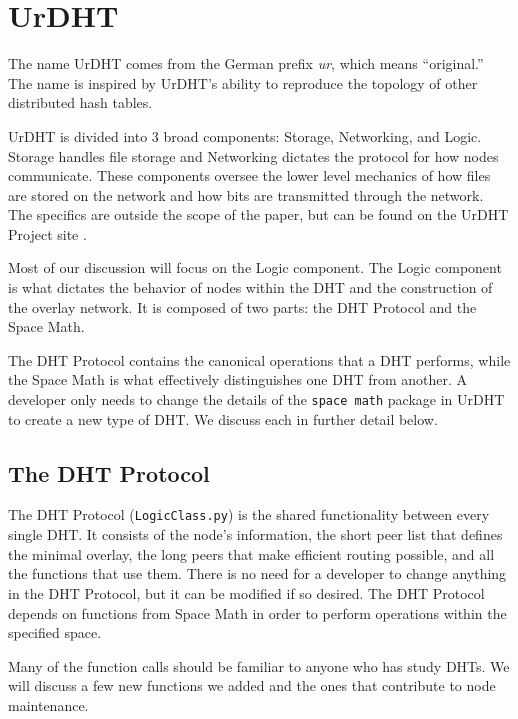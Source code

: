 \section{UrDHT}
\label{sec:urdht}


The name UrDHT comes from the German prefix \textit{ur}, which means ``original.'' 
The name is inspired by UrDHT's ability to reproduce the topology of other distributed hash tables.

UrDHT is divided into 3 broad components: Storage, Networking, and Logic.
Storage handles file storage and Networking dictates the protocol for how nodes communicate.
These components oversee the lower level mechanics of how files are stored on the network and how bits are transmitted through the network.
The specifics are outside the scope of the paper, but can be found on the UrDHT Project site \cite{urdht}.

Most of our discussion will focus on the Logic component.
The Logic component is what dictates the behavior of nodes within the DHT and the construction of the overlay network.
It is composed of two parts: the DHT Protocol and the Space Math.

The DHT Protocol contains the canonical operations that a DHT performs, while the Space Math is what effectively distinguishes one DHT from another.
A developer only needs to change the details of the \texttt{space math} package in UrDHT to create a new type of DHT.
We discuss each in further detail below.

\subsection{The DHT Protocol }
\label{sec:protocol}

The DHT Protocol (\texttt{LogicClass.py}) \cite{urdht} is the shared functionality between every single DHT.
It consists of the node's information, the short peer list that defines the minimal overlay, the long peers that make efficient routing possible, and all the functions that use them.
There is no need for a developer to change anything in the DHT Protocol, but it can be modified if so desired.
The DHT Protocol depends on functions from Space Math in order to perform operations within the specified space.

Many of the function calls should be familiar to anyone who has study DHTs.
We will discuss a few new functions we added and the ones that contribute to node maintenance.



